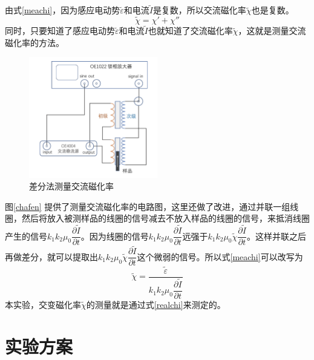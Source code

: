 \documentclass{spaexp}
\begin{document}
                由式\eqref{meachi}，因为感应电动势$\tilde{\varepsilon}$和电流$\tilde{I}$是复数，所以交流磁化率$\tilde{\chi}$也是复数。
                \begin{equation}
                    \tilde{\chi} = \chi ' +\chi ''
                    \label{complexchi}
                \end{equation}
                同时，只要知道了感应电动势$\tilde{\varepsilon}$和电流$\tilde{I}$也就知道了交流磁化率$\tilde{\chi}$，这就是测量交流磁化率的方法。
                \begin{figure}[h]      
                    \centering 
                    \includegraphics[width=0.5\textwidth]{meachi.png}
                    \caption{差分法测量交流磁化率}\label{chafen}
                    
                \end{figure}
                
                图\autoref{chafen} 提供了测量交流磁化率的电路图，这里还做了改进，通过并联一组线圈，然后将放入被测样品的线圈的信号减去不放入样品的线圈的信号，来抵消线圈产生的信号$k_1k_2\mu_0\dfrac{\partial \tilde{I}}{\partial t}$。因为线圈的信号$k_1k_2\mu_0\dfrac{\partial \tilde{I}}{\partial t}$远强于$k_1k_2\mu_0\tilde{\chi}\dfrac{\partial \tilde{I}}{\partial t}$。这样并联之后再做差分，就可以提取出$k_1k_2\mu_0\tilde{\chi}\dfrac{\partial \tilde{I}}{\partial t}$这个微弱的信号。所以式\eqref{meachi}可以改写为
                \begin{equation}
                    \tilde{\chi} = \dfrac{\tilde{\varepsilon}}{k_1 k_2\mu_0 \dfrac{\partial \tilde{I}}{\partial t}} 
                    \label{realchi}
                \end{equation}
                本实验，交变磁化率$\tilde{\chi}$的测量就是通过式\eqref{realchi}来测定的。

            
    
    \section{实验方案}
\end{document}
